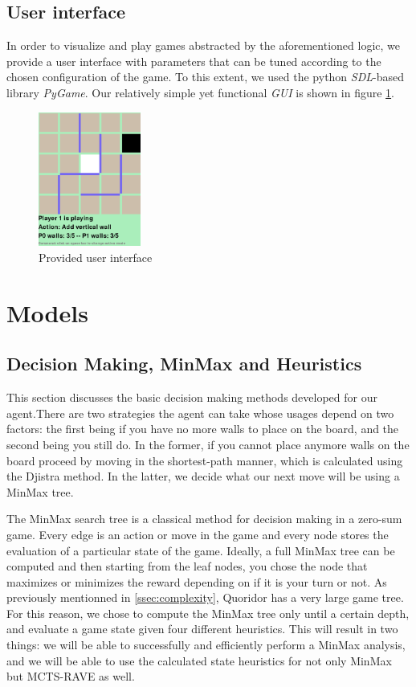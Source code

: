 \documentclass[journal, a4paper]{IEEEtran}
\begin{document}
\subsection{User interface}
In order to visualize and play games abstracted by the aforementioned logic, we provide a user interface with parameters that can be tuned according to the chosen configuration of the game. To this extent, we used the python \textit{SDL}-based library \textit{PyGame}\cite{pygame}. Our relatively simple yet functional \textit{GUI} is shown in figure \ref{fig:gui}.
\begin{figure}
    \centering
    \includegraphics[width=0.3\textwidth]{figures/gui.png}
    \caption{Provided user interface}
    \label{fig:gui}
\end{figure}


\section{Models}
\label{sec:models}

\subsection{Decision Making, MinMax and Heuristics}\label{ssec:heuristics}

This section discusses the basic decision making methods developed for our agent.There are two strategies the agent can take whose usages depend on two factors: the first being if you have no more walls to place on the board, and the second being you still do.
In the former, if you cannot place anymore walls on the board proceed by moving in the shortest-path manner, which is calculated using the Djistra method. 
In the latter, we decide what our next move will be using a MinMax tree.

The MinMax search tree is a classical method for decision making in a zero-sum game. Every edge is an action or move in the game and every node stores the evaluation of a particular state of the game.
Ideally, a full MinMax tree can be computed and then starting from the leaf nodes, you chose the node that maximizes or minimizes the reward depending on if it is your turn or not. As previously mentionned in \ref{ssec:complexity}, Quoridor has a very large game tree. For this reason, we chose to compute the MinMax tree only until a certain depth, and evaluate a game state given four different heuristics. This will result in two things: we will be able to successfully and efficiently perform a MinMax analysis, and we will be able to use the calculated state heuristics for not only MinMax but MCTS-RAVE as well.
\end{document}
